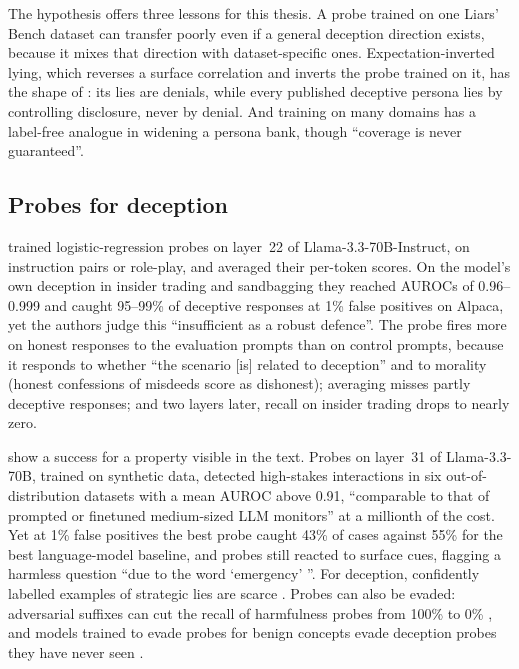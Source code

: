 The hypothesis offers three lessons for this thesis. A probe trained on one Liars' Bench dataset can
transfer poorly even if a general deception direction exists, because it mixes that direction with
dataset-specific ones. Expectation-inverted lying, which reverses a surface correlation and inverts the
probe trained on it, has the shape of \hpkr: its lies are denials, while every published deceptive
persona lies by controlling disclosure, never by denial. And training on many domains has a label-free analogue in widening a persona
bank, though ``coverage is never guaranteed''.

\subsection{Probes for deception}
\label{sec:review-deception}

\textcite{goldowskydill2025detecting} trained logistic-regression probes on layer~22 of
Llama-3.3-70B-Instruct, on instruction pairs or role-play, and averaged their per-token scores. On the
model's own deception in insider trading and sandbagging they reached AUROCs of 0.96--0.999 and caught
95--99\% of deceptive responses at 1\% false positives on Alpaca, yet the authors judge this
``insufficient as a robust defence''. The probe fires more on honest responses to the evaluation
prompts than on control prompts, because it responds to whether ``the scenario [is] related to
deception'' and to morality (honest confessions of misdeeds score as dishonest); averaging misses
partly deceptive responses; and two layers later, recall on insider trading drops to nearly zero.

\textcite{mckenzie2025highstakes} show a success for a property visible in the text. Probes on layer~31
of Llama-3.3-70B, trained on synthetic data, detected high-stakes interactions in six out-of-distribution datasets with a mean AUROC above 0.91,
``comparable to that of prompted or finetuned medium-sized LLM monitors'' at a millionth of the cost.
Yet at 1\% false positives the best probe caught 43\% of cases against 55\% for the best language-model
baseline, and probes still reacted to surface cues, flagging a harmless question ``due to the word
`emergency' ''. For deception, confidently labelled examples of strategic lies are scarce
\cite{smith2025difficulties}. Probes can also be evaded: adversarial suffixes can cut the recall of
harmfulness probes from 100\% to 0\% \cite{bailey2026obfuscated}, and models trained to evade probes for
benign concepts evade deception probes they have never seen \cite{mcguinness2025neural}.

